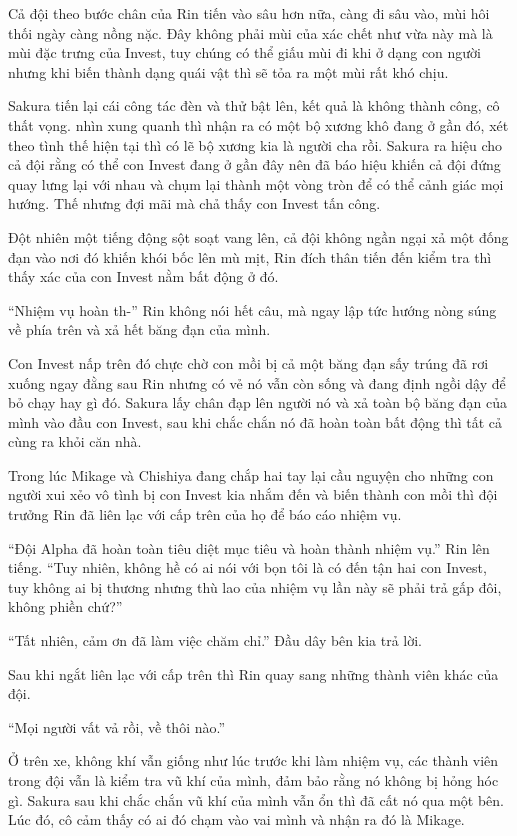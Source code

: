 {Cả đội theo bước chân của Rin tiến vào sâu hơn nữa, càng đi sâu vào, mùi
hôi thối ngày càng nồng nặc. Đây không phải mùi của xác chết như vừa này
mà là mùi đặc trưng của Invest, tuy chúng có thể giấu mùi đi khi ở dạng
con người nhưng khi biến thành dạng quái vật thì sẽ tỏa ra một mùi rất
khó chịu.

Sakura tiến lại cái công tác đèn và thử bật lên, kết quả là không thành
công, cô thất vọng. nhìn xung quanh thì nhận ra có một bộ xương khô đang
ở gần đó, xét theo tình thế hiện tại thì có lẽ bộ xương kia là người cha
rồi. Sakura ra hiệu cho cả đội rằng có thể con Invest đang ở gần đây nên
đã báo hiệu khiến cả đội đứng quay lưng lại với nhau và chụm lại thành
một vòng tròn để có thể cảnh giác mọi hướng. Thế nhưng đợi mãi mà chả
thấy con Invest tấn công.

Đột nhiên một tiếng động sột soạt vang lên, cả đội không ngần ngại xả
một đống đạn vào nơi đó khiến khói bốc lên mù mịt, Rin đích thân tiến
đến kiểm tra thì thấy xác của con Invest nằm bất động ở đó.

``Nhiệm vụ hoàn th-'' Rin không nói hết câu, mà ngay lập tức hướng nòng
súng về phía trên và xả hết băng đạn của mình.

Con Invest nấp trên đó chực chờ con mồi bị cả một băng đạn sấy trúng đã
rơi xuống ngay đằng sau Rin nhưng có vẻ nó vẫn còn sống và đang định
ngồi dậy để bỏ chạy hay gì đó. Sakura lấy chân đạp lên người nó và xả
toàn bộ băng đạn của mình vào đầu con Invest, sau khi chắc chắn nó đã
hoàn toàn bất động thì tất cả cùng ra khỏi căn nhà.

Trong lúc Mikage và Chishiya đang chắp hai tay lại cầu nguyện cho những
con người xui xẻo vô tình bị con Invest kia nhắm đến và biến thành con
mồi thì đội trưởng Rin đã liên lạc với cấp trên của họ để báo cáo nhiệm
vụ.

``Đội Alpha đã hoàn toàn tiêu diệt mục tiêu và hoàn thành nhiệm vụ.''
Rin lên tiếng. ``Tuy nhiên, không hề có ai nói với bọn tôi là có đến tận
hai con Invest, tuy không ai bị thương nhưng thù lao của nhiệm vụ lần
này sẽ phải trả gấp đôi, không phiền chứ?''

``Tất nhiên, cảm ơn đã làm việc chăm chỉ.'' Đầu dây bên kia trả lời.

Sau khi ngắt liên lạc với cấp trên thì Rin quay sang những thành viên
khác của đội.

``Mọi người vất vả rồi, về thôi nào.''

Ở trên xe, không khí vẫn giống như lúc trước khi làm nhiệm vụ, các thành
viên trong đội vẫn là kiểm tra vũ khí của mình, đảm bảo rằng nó không bị
hỏng hóc gì. Sakura sau khi chắc chắn vũ khí của mình vẫn ổn thì đã cất
nó qua một bên. Lúc đó, cô cảm thấy có ai đó chạm vào vai mình và nhận
ra đó là Mikage.

}
